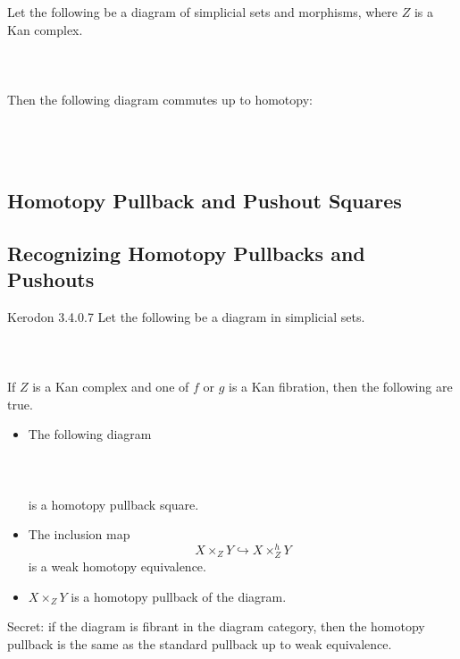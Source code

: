 \documentclass[a4paper]{article}
\begin{document}
\begin{lmm}{}{} Let the following be a diagram of simplicial sets and morphisms, where $Z$ is a Kan complex. \\~\\
\\~\\
Then the following diagram commutes up to homotopy: \\~\\
\\~\\
\end{lmm}

\subsection{Homotopy Pullback and Pushout Squares}

\subsection{Recognizing Homotopy Pullbacks and Pushouts}
\begin{prp}{Kerodon 3.4.0.7}{} Let the following be a diagram in simplicial sets. \\~\\
\\~\\
If $Z$ is a Kan complex and one of $f$ or $g$ is a Kan fibration, then the following are true. 
\begin{itemize}
\item The following diagram \\~\\
\\~\\
is a homotopy pullback square. 
\item The inclusion map $$X\times_ZY\hookrightarrow X\times_Z^hY$$ is a weak homotopy equivalence. 
\item $X\times_ZY$ is a homotopy pullback of the diagram. 
\end{itemize}
\end{prp}

Secret: if the diagram is fibrant in the diagram category, then the homotopy pullback is the same as the standard pullback up to weak equivalence. 
\end{document}
